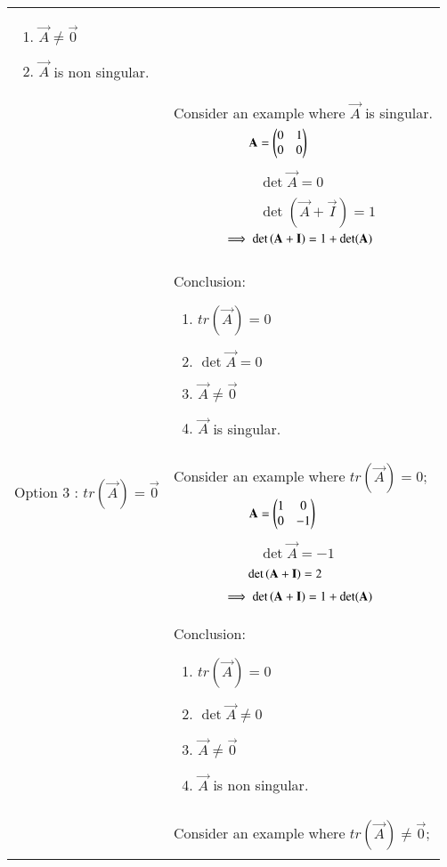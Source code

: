 \documentclass[journal,12pt]{IEEEtran}
\begin{document}
\begin{longtable}{|p{5cm}|p{13cm}|}
{\begin{enumerate}
	\item $\vec{A} \neq \vec{0}$
	\item $\vec{A}$ is non singular.\end{enumerate}}\\
		& Consider an example where $\vec{A}$ is  singular.\\
	& $\qquad\qquad\qquad\mathbf{A}=\begin{pmatrix}0&1\\0&0\end{pmatrix}$\\
	&\\
	&$\qquad\qquad\qquad\det{\vec{A}}=0$\\
	&\\
	&$\qquad\qquad\qquad \det(\vec{A}+\vec{I})=1$ \\
	& $\qquad\qquad\implies\det\left(\mathbf{A}+\mathbf{I}\right)=1+\det(\mathbf{A})$\\
	&\\
	& Conclusion: {\begin{enumerate}
	\item $tr(\vec{A})=0$
	\item $\det{\vec{A}}=0$
	\item $\vec{A} \neq \vec{0}$
	\item $\vec{A}$ is singular.\end{enumerate}}\\
	\hline
	\multirow{3}{*}{Option 3 : $tr(\vec{A})=\vec{0}$} & \\
	& Consider an example where $tr(\vec{A})=0;$\\
	& $\qquad\qquad\qquad\mathbf{A}= \begin{pmatrix}1&0\\0&-1\end{pmatrix}$\\
	&\\
    & $\qquad\qquad\qquad\det\vec{A}=-1$\\
    &\\
    & $\qquad\qquad\qquad\det\left(\mathbf{A}+\mathbf{I}\right)=2$\\
    &\\
    & $\qquad\qquad\implies\det\left(\mathbf{A}+\mathbf{I}\right)=1+\det(\mathbf{A}) $\\
   
    & Conclusion: {\begin{enumerate}
	\item $tr(\vec{A})=0$
	\item $\det{\vec{A}}\neq0$
	\item $\vec{A}\neq\vec{0}$
	\item $\vec{A}$ is non singular.\end{enumerate}}\\
	&\\
	& Consider an example where $tr(\vec{A})\neq \vec{0}$;\\
	&\\
	

\end{longtable}
\end{document}
